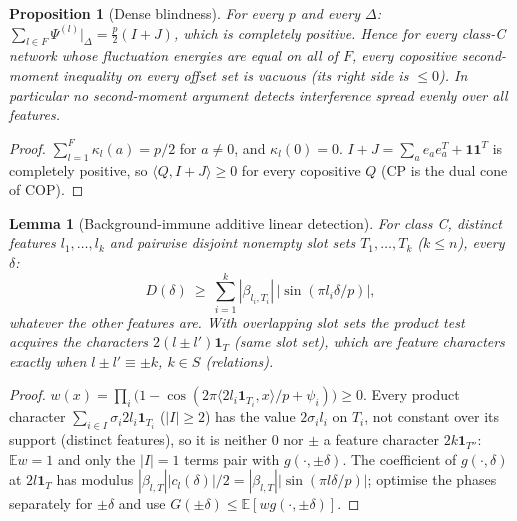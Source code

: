 \documentclass[11pt]{article}
\newtheorem{proposition}[theorem]{Proposition}
\newtheorem{lemma}[theorem]{Lemma}
\theoremstyle{definition}
\begin{document}
\begin{proposition}[Dense blindness]\label{prop:dense}
For every $p$ and every $\Delta$: $\sum_{l\in F}\Psi^{(l)}\big|_\Delta=\tfrac p2(I+J)$, which is completely positive. Hence for every
class-C network whose fluctuation energies are equal on all of $F$, every copositive second-moment inequality on every offset set is
vacuous (its right side is $\le0$). In particular no second-moment argument detects interference spread evenly over all features.
\end{proposition}
\begin{proof} $\sum_{l=1}^F\kappa_l(a)=p/2$ for $a\ne0$, and $\kappa_l(0)=0$. $I+J=\sum_ae_ae_a^T+\mathbf1\mathbf1^T$ is completely positive,
so $\langle Q,I+J\rangle\ge0$ for every copositive $Q$ (CP is the dual cone of COP).\end{proof}

\begin{lemma}[Background-immune additive linear detection]\label{lem:lin}
For class C, distinct features $l_1,\dots,l_k$ and pairwise disjoint nonempty slot sets $T_1,\dots,T_k$ ($k\le n$), every $\delta$:
\[D(\delta)\ \ge\ \sum_{i=1}^k|\beta_{l_i,T_i}|\,|\sin(\pi l_i\delta/p)| ,\]
whatever the other features are. With overlapping slot sets the product test acquires the characters $2(l\pm l')\mathbf 1_T$
(same slot set), which are feature characters exactly when $l\pm l'\equiv\pm k$, $k\in S$ (relations).
\end{lemma}
\begin{proof} $w(x)=\prod_i\big(1-\cos(2\pi\langle 2l_i\mathbf1_{T_i},x\rangle/p+\psi_i)\big)\ge0$. Every product character
$\sum_{i\in I}\sigma_i2l_i\mathbf1_{T_i}$ ($|I|\ge2$) has the value $2\sigma_il_i$ on $T_i$, not constant over its support (distinct
features), so it is neither $0$ nor $\pm$ a feature character $2k\mathbf 1_{T''}$: $\mathbb Ew=1$ and only the $|I|=1$ terms pair with
$g(\cdot,\pm\delta)$. The coefficient of $g(\cdot,\delta)$ at $2l\mathbf1_T$ has modulus $|\beta_{l,T}||c_l(\delta)|/2=|\beta_{l,T}||\sin(\pi l\delta/p)|$;
optimise the phases separately for $\pm\delta$ and use $G(\pm\delta)\le\mathbb E[wg(\cdot,\pm\delta)]$.\end{proof}
\end{document}
